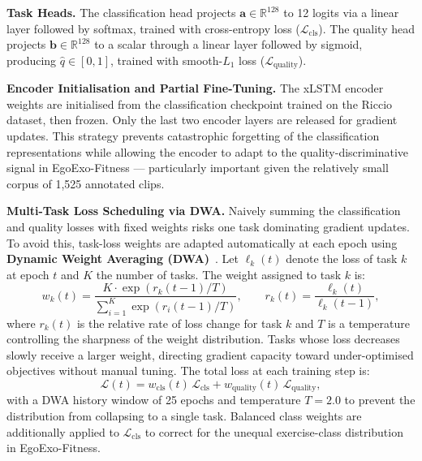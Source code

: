 \documentclass[conference,onecolumn,oneside]{IEEEtran}
\begin{document}
\textbf{Task Heads.}
The classification head projects $\mathbf{a} \in \mathbb{R}^{128}$
to 12 logits via a linear layer followed by softmax, trained with
cross-entropy loss ($\mathcal{L}_{\mathrm{cls}}$). The quality head
projects $\mathbf{b} \in \mathbb{R}^{128}$ to a scalar through a
linear layer followed by sigmoid, producing
$\hat{q} \in [0,1]$, trained with smooth-$L_1$ loss
($\mathcal{L}_{\mathrm{quality}}$).

\textbf{Encoder Initialisation and Partial Fine-Tuning.}
The xLSTM encoder weights are initialised from the classification
checkpoint trained on the Riccio dataset, then frozen. Only the last
two encoder layers are released for gradient updates. This strategy
prevents catastrophic forgetting of the classification representations
while allowing the encoder to adapt to the quality-discriminative
signal in EgoExo-Fitness — particularly important given the relatively
small corpus of 1{,}525 annotated clips.

\textbf{Multi-Task Loss Scheduling via DWA.}
Naively summing the classification and quality losses with fixed
weights risks one task dominating gradient updates. To avoid this,
task-loss weights are adapted automatically at each epoch using
\textbf{Dynamic Weight Averaging (DWA)}~\cite{deepmtl2r}. Let
$\ell_k(t)$ denote the loss of task $k$ at epoch $t$ and $K$ the
number of tasks. The weight assigned to task $k$ is:
\begin{equation}
    w_k(t) = \frac{K \cdot \exp\!\left(r_k(t-1)/T\right)}
                  {\sum_{i=1}^{K}\exp\!\left(r_i(t-1)/T\right)},
    \qquad
    r_k(t) = \frac{\ell_k(t)}{\ell_k(t-1)},
\end{equation}
where $r_k(t)$ is the relative rate of loss change for task $k$ and
$T$ is a temperature controlling the sharpness of the weight
distribution. Tasks whose loss decreases slowly receive a larger
weight, directing gradient capacity toward under-optimised objectives
without manual tuning. The total loss at each training step is:
\begin{equation}
    \mathcal{L}(t) = w_{\mathrm{cls}}(t)\,\mathcal{L}_{\mathrm{cls}}
    + w_{\mathrm{quality}}(t)\,\mathcal{L}_{\mathrm{quality}},
\end{equation}
with a DWA history window of 25 epochs and temperature $T{=}2.0$ to
prevent the distribution from collapsing to a single task. Balanced
class weights are additionally applied to $\mathcal{L}_{\mathrm{cls}}$
to correct for the unequal exercise-class distribution in
EgoExo-Fitness.
\end{document}
